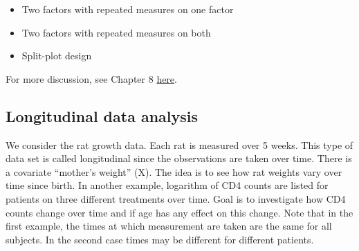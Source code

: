 \documentclass[12pt,]{book}
\providecommand{\tightlist}{%
  \setlength{\itemsep}{0pt}\setlength{\parskip}{0pt}}
\begin{document}
\begin{itemize}
\tightlist
\item
  Two factors with repeated measures on one factor
\item
  Two factors with repeated measures on both
\item
  Split-plot design
\end{itemize}

For more discussion, see Chapter 8
\href{https://stat.ethz.ch/~meier/teaching/anova/split-plot-designs.html\#}{here}.

\subsection{Longitudinal data
analysis}\label{longitudinal-data-analysis}

We consider the rat growth data. Each rat is measured over 5 weeks. This
type of data set is called longitudinal since the observations are taken
over time. There is a covariate ``mother's weight'' (X). The idea is to
see how rat weights vary over time since birth. In another example,
logarithm of CD4 counts are listed for patients on three different
treatments over time. Goal is to investigate how CD4 counts change over
time and if age has any effect on this change. Note that in the first
example, the times at which measurement are taken are the same for all
subjects. In the second case times may be different for different
patients.
\end{document}
